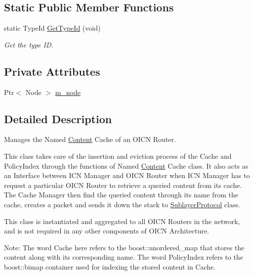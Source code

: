 \subsection*{Static Public Member Functions}
\begin{DoxyCompactItemize}
\item 
static Type\-Id \hyperlink{classns3_1_1CacheManager_ac9b2923c1cbddb3868245fd3e0983159}{Get\-Type\-Id} (void)
\begin{DoxyCompactList}\small\item\em Get the type I\-D. \end{DoxyCompactList}\end{DoxyCompactItemize}
\subsection*{Private Attributes}
\begin{DoxyCompactItemize}
\item 
Ptr$<$ Node $>$ \hyperlink{classns3_1_1CacheManager_acc6de7f84389b36268a9124a5f6b03d8}{m\-\_\-node}
\end{DoxyCompactItemize}


\subsection{Detailed Description}
Manages the Named \hyperlink{classns3_1_1Content}{Content} Cache of an O\-I\-C\-N Router. 

This class takes care of the insertion and eviction process of the Cache and Policy\-Index through the functions of Named \hyperlink{classns3_1_1Content}{Content} Cache class. It also acts as an Interface between I\-C\-N Manager and O\-I\-C\-N Router when I\-C\-N Manager has to request a particular O\-I\-C\-N Router to retrieve a queried content from its cache. The Cache Manager then find the queried content through its name from the cache, creates a packet and sends it down the stack to \hyperlink{classns3_1_1SublayerProtocol}{Sublayer\-Protocol} class.

This class is instantiated and aggregated to all O\-I\-C\-N Routers in the network, and is not required in any other components of O\-I\-C\-N Architecture.

Note\-: The word Cache here refers to the boost\-::unordered\-\_\-map that stores the content along with its corresponding name. The word Policy\-Index refers to the boost\-::bimap container used for indexing the stored content in Cache. 


